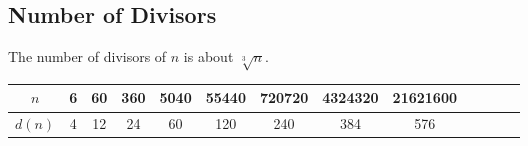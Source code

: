 \subsection{Number of Divisors}

The number of divisors of $n$ is about $\sqrt[3]{n}$.

\begin{table}[H]
    \centering
    \begin{tabular}{|c|c|c|c|c|c|c|c|c|c|c|c|c|}
        \hline
        \cellcolor{gray!40} $n$ & 6 & 60 & 360 & 5040 & 55440 & 720720 & 4324320 & 21621600 \\
        \hline
        \cellcolor{gray!40} $d(n)$ & 4 & 12 & 24 & 60 & 120 & 240 & 384 & 576 \\
        \hline
    \end{tabular}
\end{table}